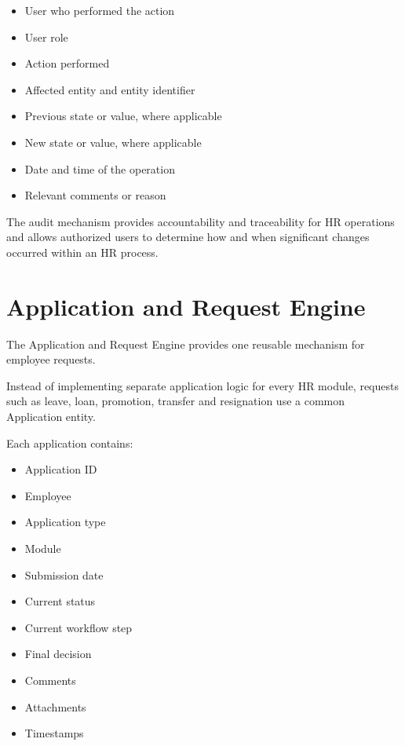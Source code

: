 \documentclass[12pt,a4paper]{article}
\begin{document}
\begin{itemize}

    \item User who performed the action

    \item User role

    \item Action performed

    \item Affected entity and entity identifier

    \item Previous state or value, where applicable

    \item New state or value, where applicable

    \item Date and time of the operation

    \item Relevant comments or reason

\end{itemize}

The audit mechanism provides accountability and traceability for
HR operations and allows authorized users to determine how and
when significant changes occurred within an HR process.

\section{Application and Request Engine}

The Application and Request Engine provides one reusable mechanism
for employee requests.

Instead of implementing separate application logic for every HR
module, requests such as leave, loan, promotion, transfer and
resignation use a common Application entity.

Each application contains:

\begin{itemize}
    \item Application ID
    \item Employee
    \item Application type
    \item Module
    \item Submission date
    \item Current status
    \item Current workflow step
    \item Final decision
    \item Comments
    \item Attachments
    \item Timestamps
\end{itemize}
\end{document}
